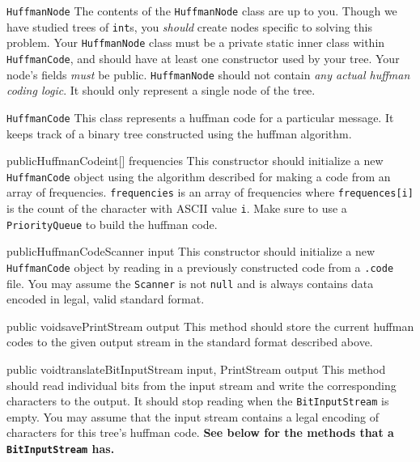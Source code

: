 \documentclass[programming]{../../mfcs}
\begin{document}
\begin{question}{\texttt{HuffmanNode}}
    The contents of the \texttt{HuffmanNode} class are up to you. Though we have studied
    trees of \texttt{int}s, you \emph{should} create nodes specific to solving this problem.
    Your \texttt{HuffmanNode} class must be a private static inner class within \texttt{HuffmanCode},
    and should have at least one constructor used by your tree.
    Your node's fields \emph{must} be public. \texttt{HuffmanNode} should not contain \emph{any actual huffman coding logic}.
    It should only represent a single node of the tree.
\end{question}

\begin{question}{\texttt{HuffmanCode}}
    This class represents a huffman code for a particular message. It keeps track of a
    binary tree constructed using the huffman algorithm.
\vspace{1em}

\begin{method}{public}{HuffmanCode}{int[] frequencies}
    This constructor should initialize a new \texttt{HuffmanCode} object using the algorithm
    described for making a code from an array of frequencies.  \texttt{frequencies} is an
    array of frequencies where \texttt{frequences[i]} is the count of the character with
    ASCII value \texttt{i}. Make sure to use a \texttt{PriorityQueue} to build the huffman
    code.
\end{method}

\begin{method}{public}{HuffmanCode}{Scanner input}
    This constructor should initialize a new \texttt{HuffmanCode} object by reading in a
    previously constructed code from a \texttt{.code} file. You may assume the
    \texttt{Scanner} is not \texttt{null} and is always contains data encoded in legal,
    valid standard format.
\end{method}

\begin{method}{public void}{save}{PrintStream output}
    This method should store the current huffman codes to the given output stream in the
    standard format described above.
\end{method}

\begin{method}{public void}{translate}{BitInputStream input, PrintStream output}
    This method should read individual bits from the input stream and write the
    corresponding characters to the output. It should stop reading when the
    \texttt{BitInputStream} is empty. You may assume that the input stream contains a legal
    encoding of characters for this tree's huffman code.  \textbf{See below for the methods
    that a \texttt{BitInputStream} has.}
\end{method}
\end{question}
\end{document}
